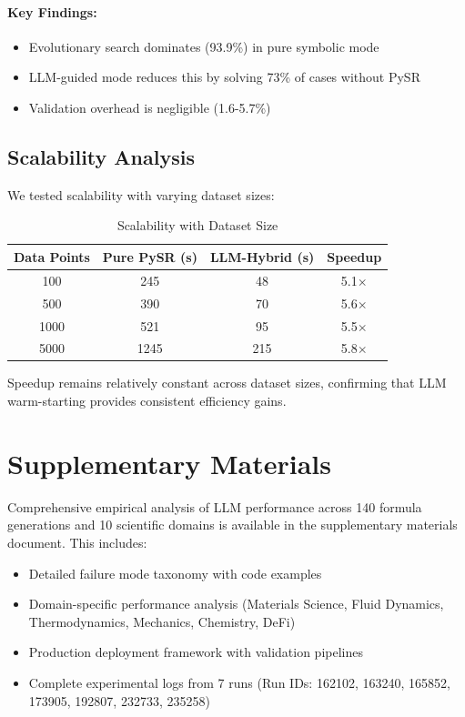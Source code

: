 \documentclass[twoside,11pt]{article}
\begin{document}
\paragraph{Key Findings:}
\begin{itemize}
\item Evolutionary search dominates (93.9\%) in pure symbolic mode
\item LLM-guided mode reduces this by solving 73\% of cases without PySR
\item Validation overhead is negligible (1.6-5.7\%)
\end{itemize}

\subsection{Scalability Analysis}

We tested scalability with varying dataset sizes:

\begin{table}[H]
\centering
\caption{Scalability with Dataset Size}
\label{tab:scalability}
\begin{tabular}{@{}cccc@{}}
\toprule
\textbf{Data Points} & \textbf{Pure PySR (s)} & \textbf{LLM-Hybrid (s)} & \textbf{Speedup} \\
\midrule
100 & 245 & 48 & 5.1$\times$ \\
500 & 390 & 70 & 5.6$\times$ \\
1000 & 521 & 95 & 5.5$\times$ \\
5000 & 1245 & 215 & 5.8$\times$ \\
\bottomrule
\end{tabular}
\end{table}

Speedup remains relatively constant across dataset sizes, confirming that LLM warm-starting provides consistent efficiency gains.


\section*{Supplementary Materials}

Comprehensive empirical analysis of LLM performance across 140 formula generations and 10 scientific domains is available in the supplementary materials document. This includes:

\begin{itemize}
\item Detailed failure mode taxonomy with code examples
\item Domain-specific performance analysis (Materials Science, Fluid Dynamics, Thermodynamics, Mechanics, Chemistry, DeFi)
\item Production deployment framework with validation pipelines
\item Complete experimental logs from 7 runs (Run IDs: 162102, 163240, 165852, 173905, 192807, 232733, 235258)
\end{itemize}
\end{document}
